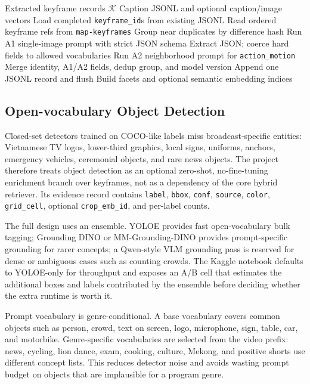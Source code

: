 \documentclass[conference]{IEEEtran}
\begin{document}
\begin{algorithm}[!t]
\caption{Structured visual captioning extension}
\label{alg:captioning}
\footnotesize
\begin{algorithmic}[1]
\Require Extracted keyframe records $\mathcal{K}$
\Ensure Caption JSONL and optional caption/image vectors
\State Load completed \texttt{keyframe\_id}s from existing JSONL
  \State Read ordered keyframe refs from \texttt{map-keyframes}
  \State Group near duplicates by difference hash
    \State Run A1 single-image prompt with strict JSON schema
    \State Extract JSON; coerce hard fields to allowed vocabularies
      \State Run A2 neighborhood prompt for \texttt{action\_motion}
    \EndIf
    \State Merge identity, A1/A2 fields, dedup group, and model version
    \State Append one JSONL record and flush
  \EndFor
\EndFor
\State Build facets and optional semantic embedding indices
\end{algorithmic}
\end{algorithm}

\subsection{Open-vocabulary Object Detection}

Closed-set detectors trained on COCO-like labels miss broadcast-specific
entities: Vietnamese TV logos, lower-third graphics, local signs, uniforms,
anchors, emergency vehicles, ceremonial objects, and rare news objects. The
project therefore treats object detection as an optional zero-shot,
no-fine-tuning enrichment branch over keyframes, not as a dependency of the
core hybrid retriever. Its evidence record contains
\texttt{label}, \texttt{bbox}, \texttt{conf}, \texttt{source},
\texttt{color}, \texttt{grid\_cell}, optional \texttt{crop\_emb\_id}, and
per-label counts.

The full design uses an ensemble. YOLOE \cite{wang2025yoloe} provides fast
open-vocabulary bulk tagging; Grounding DINO \cite{liu2024groundingdino} or
MM-Grounding-DINO
provides prompt-specific grounding for rarer concepts; a Qwen-style VLM
grounding pass is reserved for dense or ambiguous cases such as counting
crowds. The Kaggle notebook defaults to YOLOE-only for throughput and exposes an
A/B cell that estimates the additional boxes and labels contributed by the
ensemble before deciding whether the extra runtime is worth it.

Prompt vocabulary is genre-conditional. A base vocabulary covers common
objects such as person, crowd, text on screen, logo, microphone, sign, table,
car, and motorbike. Genre-specific vocabularies are selected from the video
prefix: news, cycling, lion dance, exam, cooking, culture, Mekong, and positive
shorts use different concept lists. This reduces detector noise and avoids
wasting prompt budget on objects that are implausible for a program genre.
\end{document}
